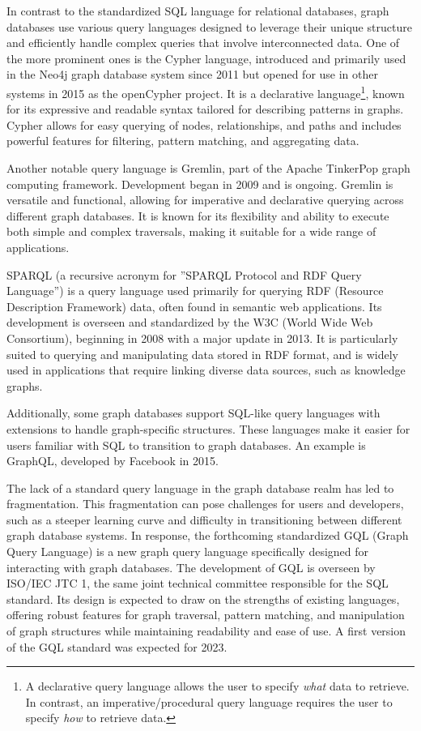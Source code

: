 In contrast to the standardized SQL language for relational databases, graph databases use various query languages designed to leverage their unique structure and efficiently handle complex queries that involve interconnected data. One of the more prominent ones is the Cypher language, introduced and primarily used in the Neo4j graph database system since 2011 but opened for use in other systems in 2015 as the openCypher project. It is a declarative language\footnote{A declarative query language allows the user to specify \emph{what} data to retrieve. In contrast, an imperative/procedural query language requires the user to specify \emph{how} to retrieve data.}, known for its expressive and readable syntax tailored for describing patterns in graphs. Cypher allows for easy querying of nodes, relationships, and paths and includes powerful features for filtering, pattern matching, and aggregating data.

Another notable query language is Gremlin, part of the Apache TinkerPop graph computing framework. Development began in 2009 and is ongoing. Gremlin is versatile and functional, allowing for imperative and declarative querying across different graph databases. It is known for its flexibility and ability to execute both simple and complex traversals, making it suitable for a wide range of applications.

SPARQL (a recursive acronym for ''SPARQL Protocol and RDF Query Language'') is a query language used primarily for querying RDF (Resource Description Framework) data, often found in semantic web applications. Its development is overseen and standardized by the W3C (World Wide Web Consortium), beginning in 2008 with a major update in 2013. It is particularly suited to querying and manipulating data stored in RDF format, and is widely used in applications that require linking diverse data sources, such as knowledge graphs.

Additionally, some graph databases support SQL-like query languages with extensions to handle graph-specific structures. These languages make it easier for users familiar with SQL to transition to graph databases. An example is GraphQL, developed by Facebook in 2015. 

The lack of a standard query language in the graph database realm has led to fragmentation. This fragmentation can pose challenges for users and developers, such as a steeper learning curve and difficulty in transitioning between different graph database systems. In response, the forthcoming standardized GQL (Graph Query Language) is a new graph query language specifically designed for interacting with graph databases. The development of GQL is overseen by ISO/IEC JTC 1, the same joint technical committee responsible for the SQL standard. Its design is expected to draw on the strengths of existing languages, offering robust features for graph traversal, pattern matching, and manipulation of graph structures while maintaining readability and ease of use. A first version of the GQL standard was expected for 2023.


